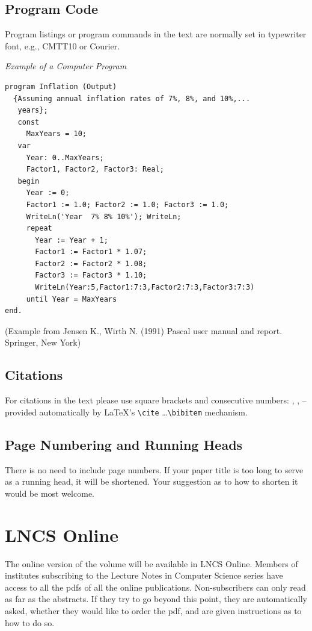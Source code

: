 \documentclass[runningheads,a4paper]{llncs}
\begin{document}
{\subsection{Program Code}

Program listings or program commands in the text are normally set in
typewriter font, e.g., CMTT10 or Courier.

\medskip

\noindent
{\it Example of a Computer Program}
\begin{verbatim}
program Inflation (Output)
  {Assuming annual inflation rates of 7%, 8%, and 10%,...
   years};
   const
     MaxYears = 10;
   var
     Year: 0..MaxYears;
     Factor1, Factor2, Factor3: Real;
   begin
     Year := 0;
     Factor1 := 1.0; Factor2 := 1.0; Factor3 := 1.0;
     WriteLn('Year  7% 8% 10%'); WriteLn;
     repeat
       Year := Year + 1;
       Factor1 := Factor1 * 1.07;
       Factor2 := Factor2 * 1.08;
       Factor3 := Factor3 * 1.10;
       WriteLn(Year:5,Factor1:7:3,Factor2:7:3,Factor3:7:3)
     until Year = MaxYears
end.
\end{verbatim}
%
\noindent
{\small (Example from Jensen K., Wirth N. (1991) Pascal user manual and
report. Springer, New York)}

\subsection{Citations}

For citations in the text please use
square brackets and consecutive numbers: \cite{jour}, \cite{lncschap},
\cite{proceeding1} -- provided automatically
by \LaTeX 's \verb|\cite| \dots\verb|\bibitem| mechanism.

\subsection{Page Numbering and Running Heads}

There is no need to include page numbers. If your paper title is too
long to serve as a running head, it will be shortened. Your suggestion
as to how to shorten it would be most welcome.

\section{LNCS Online}

The online version of the volume will be available in LNCS Online.
Members of institutes subscribing to the Lecture Notes in Computer
Science series have access to all the pdfs of all the online
publications. Non-subscribers can only read as far as the abstracts. If
they try to go beyond this point, they are automatically asked, whether
they would like to order the pdf, and are given instructions as to how
to do so.

}
\end{document}
